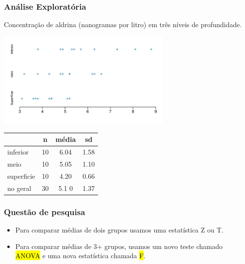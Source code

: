 \begin{frame}
\frametitle{Análise Exploratória}
\justifying
Concentração de aldrina (nanogramas por litro) em três níveis de profundidade. \\

\begin{center}
\includegraphics[width=0.65\textwidth]{5-5_anova/dotplot.png}
\end{center}

\begin{center}
\begin{tabular}{l | c c c}
		& n	& média	& sd		\\
\hline
inferior	& 10	& 6.04	& 1.58 \\
meio & 10	& 5.05	& 1.10 \\
superficie	& 10	& 4.20	& 0.66 \\
\hline
no geral	& 30	& 5.1	0	& 1.37
\end{tabular}
\end{center}

\end{frame}


\begin{frame}
\frametitle{Questão de pesquisa}
\justifying
{}

\vspace{0.5cm}

\pause

\begin{itemize}
\justifying
\item Para comparar médias de dois grupos usamos uma estatística Z ou T.

\pause
\justifying
\item Para comparar médias de 3+ grupos, usamos um novo teste chamado \hl{ANOVA} e uma nova estatística chamada \hl{F}.

\end{itemize}

\end{frame}

